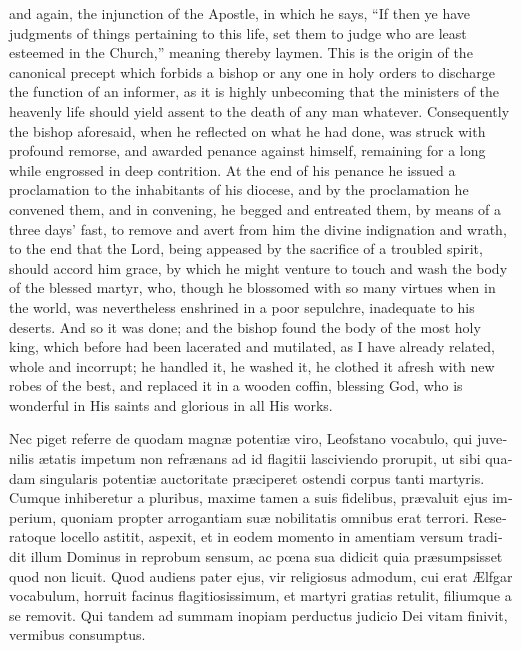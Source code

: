\documentclass[10pt]{book}
\begin{document}
\begin{paracol}{2}
and again, the injunction of the Apostle, in which he says, ``If then ye have judgments of things pertaining to this life, set them to judge who are least esteemed in the Church,'' meaning thereby laymen. This is the origin of the canonical precept which forbids a bishop or any one in holy orders to discharge the function of an informer, as it is highly unbecoming that the ministers of the heavenly life should yield assent to the death of any man whatever. Consequently the bishop aforesaid, when he reflected on what he had done, was struck with profound remorse, and awarded penance against himself, remaining for a long while engrossed in deep contrition. At the end of his penance he issued a proclamation to the inhabitants of his diocese, and by the proclamation he convened them, and in convening, he begged and entreated them, by means of a three days' fast, to remove and avert from him the divine indignation and wrath, to the end that the Lord, being appeased by the sacrifice of a troubled spirit, should accord him grace, by which he might venture to touch and wash the body of the blessed martyr, who, though he blossomed with so many virtues when in the world, was nevertheless enshrined in a poor sepulchre, inadequate to his deserts. And so it was done; and the bishop found the body of the most holy king, which before had been lacerated and mutilated, as I have already related, whole and incorrupt; he handled it, he washed it, he clothed it afresh with new robes of the best, and replaced it in a wooden coffin, blessing God, who is wonderful in His saints and glorious in all His works.

\switchcolumn*

\begin{otherlanguage}{latin}
Nec piget referre de quodam magn\ae{} potenti\ae{} viro, Leofstano vocabulo, qui juvenilis \ae{}tatis impetum non refr\ae{}nans ad id flagitii lasciviendo prorupit, ut sibi quadam singularis potenti\ae{} auctoritate pr\ae{}ciperet ostendi corpus tanti martyris. Cumque inhiberetur a pluribus, maxime tamen a suis fidelibus, pr\ae{}valuit ejus imperium, quoniam propter arrogantiam su\ae{} nobilitatis omnibus erat terrori. Reseratoque locello astitit, aspexit, et in eodem momento in amentiam versum tradidit illum Dominus in reprobum sensum, ac p\oe{}na sua didicit quia pr\ae{}sumpsisset quod non licuit. Quod audiens pater ejus, vir religiosus admodum, cui erat \AE{}lfgar vocabulum, horruit facinus flagitiosissimum, et martyri gratias retulit, filiumque a se removit. Qui tandem ad summam inopiam perductus judicio Dei vitam finivit, vermibus consumptus.
\end{otherlanguage}


\end{paracol}
\end{document}
